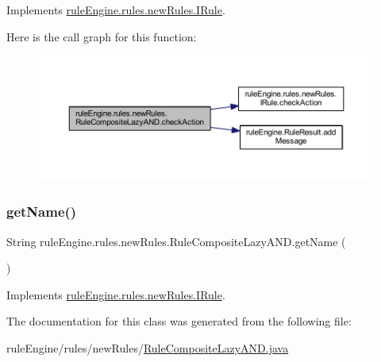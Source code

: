 Implements \mbox{\hyperlink{interfacerule_engine_1_1rules_1_1new_rules_1_1_i_rule_a72ce29a47d7a5fba75a09444a50a481e}{rule\+Engine.\+rules.\+new\+Rules.\+I\+Rule}}.

Here is the call graph for this function\+:
\nopagebreak
\begin{figure}[H]
\begin{center}
\leavevmode
\includegraphics[width=350pt]{classrule_engine_1_1rules_1_1new_rules_1_1_rule_composite_lazy_a_n_d_a58204904f81f350b7cf05aa13e0fd43b_cgraph}
\end{center}
\end{figure}
\mbox{\label{classrule_engine_1_1rules_1_1new_rules_1_1_rule_composite_lazy_a_n_d_a1fabc2dad0cccb638ee3154918c90f0d}} 
\subsubsection{\texorpdfstring{get\+Name()}{getName()}}
{\footnotesize\ttfamily String rule\+Engine.\+rules.\+new\+Rules.\+Rule\+Composite\+Lazy\+A\+N\+D.\+get\+Name (\begin{DoxyParamCaption}{ }\end{DoxyParamCaption})\hspace{0.3cm}{\ttfamily [inline]}}



Implements \mbox{\hyperlink{interfacerule_engine_1_1rules_1_1new_rules_1_1_i_rule_a99e11d165ca863908c6e985a79917067}{rule\+Engine.\+rules.\+new\+Rules.\+I\+Rule}}.



The documentation for this class was generated from the following file\+:\begin{DoxyCompactItemize}
\item 
rule\+Engine/rules/new\+Rules/\mbox{\hyperlink{_rule_composite_lazy_a_n_d_8java}{Rule\+Composite\+Lazy\+A\+N\+D.\+java}}\end{DoxyCompactItemize}
